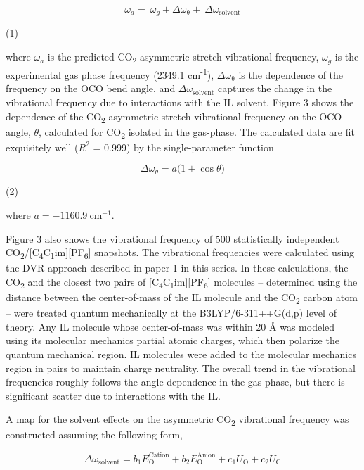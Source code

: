 \documentclass[]{article}
\begin{document}
\[\omega_{a} = \ \omega_{g} + \Delta\omega_{\mathrm{\theta}} + \ \Delta\omega_{\mathrm{\text{solvent}}}\]

(1)

where \(\omega_{a}\) is the predicted CO\textsubscript{2} asymmetric
stretch vibrational frequency, \(\omega_{g}\) is the experimental gas
phase frequency (2349.1 cm\textsuperscript{-1}),
\(\Delta\omega_{\mathrm{\theta}}\) is the dependence of the frequency on
the OCO bend angle, and \(\Delta\omega_{\mathrm{\text{solvent}}}\)
captures the change in the vibrational frequency due to interactions
with the IL solvent. Figure 3 shows the dependence of the
CO\textsubscript{2} asymmetric stretch vibrational frequency on the OCO
angle, \(\theta\), calculated for CO\textsubscript{2} isolated in the gas-phase.
The calculated data are fit exquisitely well (\(R^{2}\) = 0.999) by the
single-parameter function

\[\Delta\omega_{\theta} = a(1 + \cos{\theta)}\]

(2)

where \(a = - 1160.9\ \mathrm{c}\mathrm{m}^{\mathrm{- 1}}.\)

Figure 3 also shows the vibrational frequency of 500 statistically
independent
CO\textsubscript{2}/{[}C\textsubscript{4}C\textsubscript{1}im{]}{[}PF\textsubscript{6}{]}
snapshots. The vibrational frequencies were calculated using the DVR
approach described in paper 1 in this series. In these calculations, the
CO\textsubscript{2} and the closest two pairs of
{[}C­\textsubscript{4}C\textsubscript{1}im{]}{[}PF\textsubscript{6}{]}
molecules -- determined using the distance between the center-of-mass of
the IL molecule and the CO\textsubscript{2} carbon atom -- were treated
quantum mechanically at the B3LYP/6-311++G(d,p) level of theory. Any IL
molecule whose center-of-mass was within 20 Å was modeled using its
molecular mechanics partial atomic charges, which then polarize the
quantum mechanical region. IL molecules were added to the molecular
mechanics region in pairs to maintain charge neutrality. The overall
trend in the vibrational frequencies roughly follows the angle
dependence in the gas phase, but there is significant scatter due to
interactions with the IL.

A map for the solvent effects on the asymmetric CO\textsubscript{2}
vibrational frequency was constructed assuming the following form,

\[\Delta\omega_{\mathrm{\text{solvent}}} = b_{1}E_{\mathrm{O}}^{\text{Cation}} + b_{2}E_{\mathrm{O}}^{\text{Anion}} + c_{1}U_{\mathrm{O}} + c_{2}U_{\mathrm{C}}\]
\end{document}
